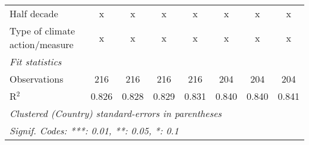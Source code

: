 \begin{tabular}{lccccccc}
   Half decade                                                                                    & x              & x             & x              & x             & x             & x             & x\\  
   Type of climate action/measure                                                                 & x              & x             & x              & x             & x             & x             & x\\  
   \midrule \emph{Fit statistics}\\
   Observations                                                                                   & 216            & 216           & 216            & 216           & 204           & 204           & 204\\  
   R$^2$                                                                                          & 0.826          & 0.828         & 0.829          & 0.831         & 0.840         & 0.840         & 0.841\\  
   \midrule
   \multicolumn{8}{l}{\emph{Clustered (Country) standard-errors in parentheses}}\\
   \multicolumn{8}{l}{\emph{Signif. Codes: ***: 0.01, **: 0.05, *: 0.1}}\\
\end{tabular}
\par\endgroup


